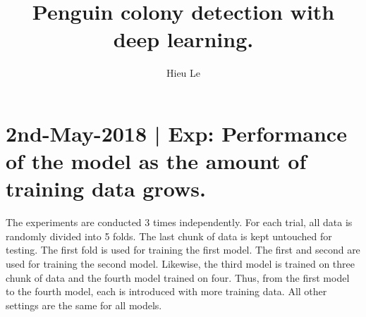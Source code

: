 \documentclass[runningheads]{llncs}
\begin{document}
\pagestyle{headings}
\mainmatter

\title{Penguin colony detection with deep learning.} %



\author{Hieu Le}




\maketitle

\section{2nd-May-2018 | Exp: Performance of the model as the amount of training data grows.}

The experiments are conducted 3 times independently. For each trial, all data is randomly divided into 5 folds. The last chunk of data is kept untouched for testing. The first fold is used for training the first model. The first and second are used for training the second model. Likewise, the third model is trained on three chunk of data and the fourth model trained on four. Thus, from the first model to the fourth model, each is introduced with more training data. All other settings are the same for all models.
\end{document}
